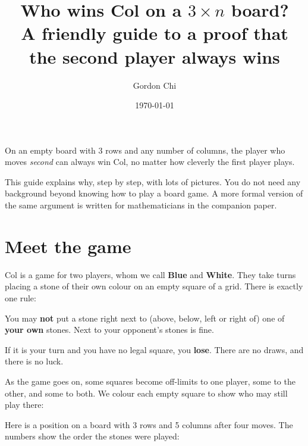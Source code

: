 \documentclass[11pt]{article}
\title{\textbf{Who wins Col on a $3\times n$ board?}\\[4pt]
\large A friendly guide to a proof that the second player always wins}
\author{Gordon Chi}
\date{\today}
\begin{document}
\maketitle

\begin{idea}
On an empty board with 3 rows and any number of columns, the player who moves
\emph{second} can always win Col, no matter how cleverly the first player
plays.
\end{idea}

This guide explains why, step by step, with lots of pictures. You do not need
any background beyond knowing how to play a board game. A more formal version of the same
argument is written for mathematicians in the companion paper.

\tableofcontents

\section{Meet the game}

Col is a game for two players, whom we call \textbf{Blue} and \textbf{White}.
They take turns placing a stone of their own colour on an empty square of a
grid. There is exactly one rule:

\begin{idea}
You may \textbf{not} put a stone right next to (above, below, left or right
of) one of \textbf{your own} stones. Next to your opponent's stones is fine.
\end{idea}

If it is your turn and you have no legal square, you \textbf{lose}. There are
no draws, and there is no luck.

\begin{center}
\end{center}

As the game goes on, some squares become off-limits to one player, some to the
other, and some to both. We colour each empty square to show who may still
play there:

\begin{center}
\end{center}

Here is a position on a board with 3 rows and 5 columns after four moves. The
numbers show the order the stones were played:

\begin{center}
\end{center}
\end{document}
